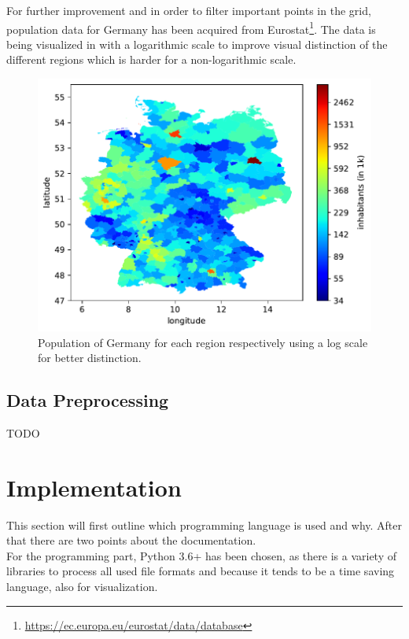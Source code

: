 For further improvement and in order to filter important points in the grid, population data for Germany has been acquired from Eurostat\footnote{\url{https://ec.europa.eu/eurostat/data/database}}. The data is being visualized in  with a logarithmic scale to improve visual distinction of the different regions which is harder for a non-logarithmic scale.\\

\begin{figure}[h!]%
\centering
\includegraphics[width=\textwidth]{plots/demo/demo2018_logscale}%
\caption{Population of Germany for each region respectively using a log scale for better distinction.}%
\label{fig:demo2018_logscale}%
\end{figure}

\subsection*{Data Preprocessing}

TODO


\section{Implementation}
\label{sec:prog}

This section will first outline which programming language is used and why. After that there are two points about the documentation.\\

For the programming part, Python 3.6+ has been chosen, as there is a variety of libraries to process all used file formats and because it tends to be a time saving language, also for visualization.\\

